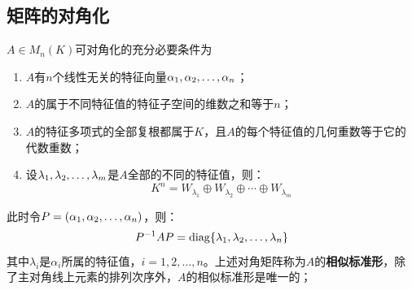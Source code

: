 \subsection{矩阵的对角化}
\begin{theorem}\label{theo:DiagCondition}
	$A\in M_{n}(K)$可对角化的充分必要条件为
	\begin{enumerate}
		\item $A$有$n$个线性无关的特征向量$\alpha_1, \alpha_2, \dots, \alpha_{n}$；
		\item $A$的属于不同特征值的特征子空间的维数之和等于$n$；
		\item $A$的特征多项式的全部复根都属于$K$，且$A$的每个特征值的几何重数等于它的代数重数；
		\item 设$\lambda_1, \lambda_2, \dots, \lambda_{m}$是$A$全部的不同的特征值，则：
		\begin{equation*}
			K^n=W_{\lambda_1}\oplus W_{\lambda_2}\oplus\cdots\oplus W_{\lambda_m}
		\end{equation*}
	\end{enumerate}
	此时令$P=(\alpha_1, \alpha_2, \dots, \alpha_{n})$，则：
	\begin{equation*}
		P^{-1}AP=\operatorname{diag}\{\lambda_1, \lambda_2, \dots, \lambda_{n}\}
	\end{equation*}
	其中$\lambda_i$是$\alpha_i$所属的特征值，$i=1,2,\dots,n$。上述对角矩阵称为$A$的\textbf{相似标准形}，除了主对角线上元素的排列次序外，$A$的相似标准形是唯一的；
\end{theorem}
